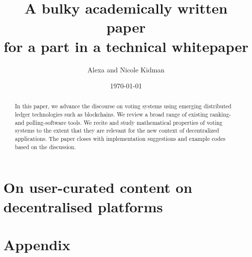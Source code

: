 

\usepackage{listings}
\usepackage{color}
\usepackage{enumitem}
\usepackage{amsmath}
\usepackage{bm}
\usepackage{hyperref}




\title{A bulky academically written paper\\ for a part in a technical whitepaper} %
\author{Alexa and Nicole Kidman}
\date{\today} %


\maketitle %

\begin{abstract}
In this paper, we advance the discourse on voting systems using emerging distributed ledger technologies such as blockchains. 
We review a broad range of existing ranking- and polling-software tools. 
We recite and study mathematical properties of voting systems to the extent that they are relevant for the new context of decentralized applications. 
The paper closes with implementation suggestions and example codes based on the discussion.
\end{abstract}

\tableofcontents \newpage

\part{On user-curated content on decentralised platforms} 

 
  \newpage
  \newpage

 \newpage
 \newpage
 \newpage
  

\part{Appendix} 

\cite{voting}
\cite{voting2}
\cite{voting3}
\cite{voting4}
\cite{picture}
\cite{video}

\printbibliography[filter=literature]

\printbibliography[heading=subbibliography, filter={others}, title={Further Resources}]

\printbibliography[heading=subbibliography, keyword=Bild, title={Picture Resources}]

\nocite{Picture2}

